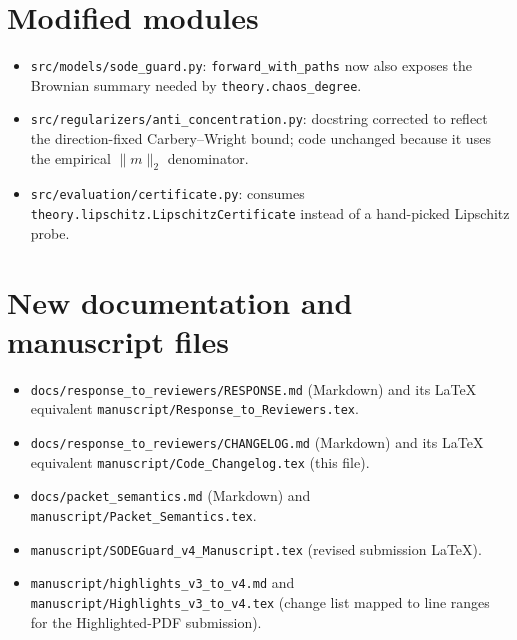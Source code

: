 \documentclass[11pt,letterpaper]{article}
\begin{document}
\section{Modified modules}
\begin{itemize}[leftmargin=1.4em]
  \item \texttt{src/models/sode\_guard.py}: \texttt{forward\_with\_paths} now
        also exposes the Brownian summary needed by
        \texttt{theory.chaos\_degree}.
  \item \texttt{src/regularizers/anti\_concentration.py}: docstring
        corrected to reflect the direction-fixed Carbery--Wright bound;
        code unchanged because it uses the empirical $\|m\|_2$
        denominator.
  \item \texttt{src/evaluation/certificate.py}: consumes
        \texttt{theory.lipschitz.LipschitzCertificate} instead of a
        hand-picked Lipschitz probe.
\end{itemize}

\section{New documentation and manuscript files}
\begin{itemize}[leftmargin=1.4em]
  \item \texttt{docs/response\_to\_reviewers/RESPONSE.md} (Markdown)
        and its LaTeX equivalent
        \texttt{manuscript/Response\_to\_Reviewers.tex}.
  \item \texttt{docs/response\_to\_reviewers/CHANGELOG.md} (Markdown)
        and its LaTeX equivalent
        \texttt{manuscript/Code\_Changelog.tex} (this file).
  \item \texttt{docs/packet\_semantics.md} (Markdown) and
        \texttt{manuscript/Packet\_Semantics.tex}.
  \item \texttt{manuscript/SODEGuard\_v4\_Manuscript.tex} (revised
        submission LaTeX).
  \item \texttt{manuscript/highlights\_v3\_to\_v4.md} and
        \texttt{manuscript/Highlights\_v3\_to\_v4.tex} (change list
        mapped to line ranges for the Highlighted-PDF submission).
\end{itemize}
\end{document}
